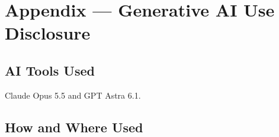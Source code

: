 \documentclass[12pt]{article}
\begin{document}
\newpage{}

\section*{Appendix --- Generative AI Use Disclosure}

\subsection*{AI Tools Used}

Claude Opus 5.5 and GPT Astra 6.1.

\subsection*{How and Where Used}
\end{document}
